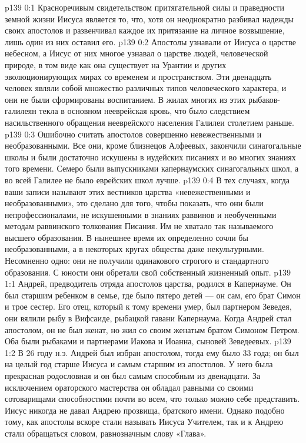 \author{Комиссия срединников}
\vs p139 0:1 Красноречивым свидетельством притягательной силы и праведности земной жизни Иисуса является то, что, хотя он неоднократно разбивал надежды своих апостолов и развенчивал каждое их притязание на личное возвышение, лишь один из них оставил его.
\vs p139 0:2 Апостолы узнавали от Иисуса о царстве небесном, а Иисус от них многое узнавал о царстве людей, человеческой природе, в том виде как она существует на Урантии и других эволюционирующих мирах со временем и пространством. Эти двенадцать человек являли собой множество различных типов человеческого характера, и они не были сформированы  воспитанием. В жилах многих из этих рыбаков\hyp{}галилеян текла в основном нееврейская кровь, что было следствием насильственного обращения нееврейского населения Галилеи столетием раньше.
\vs p139 0:3 \pc Ошибочно считать апостолов совершенно невежественными и необразованными. Все они, кроме близнецов Алфеевых, закончили синагогальные школы и были достаточно искушены в иудейских писаниях и во многих знаниях того времени. Семеро были выпускниками капернаумских синагогальных школ, а во всей Галилее не было еврейских школ лучше.
\vs p139 0:4 В тех случаях, когда ваши записи называют этих вестников царства «невежественными и необразованными», это сделано для того, чтобы показать, что они были непрофессионалами, не искушенными в знаниях раввинов и необученными методам раввинского толкования Писания. Им не хватало так называемого высшего образования. В нынешнее время их определенно сочли бы необразованными, а в некоторых кругах общества даже некультурными. Несомненно одно: они не получили одинакового строгого и стандартного образования. С юности они обретали свой собственный жизненный опыт.
\vs p139 1:1 Андрей, предводитель отряда апостолов царства, родился в Капернауме. Он был старшим ребенком в семье, где было пятеро детей --- он сам, его брат Симон и трое сестер. Его отец, который к тому времени умер, был партнером Зеведея, они вялили рыбу в Вифсаиде, рыбацкой гавани Капернаума. Когда Андрей стал апостолом, он не был женат, но жил со своим женатым братом Симоном Петром. Оба были рыбаками и партнерами Иакова и Иоанна, сыновей Зеведеевых.
\vs p139 1:2 В 26 году н.э. Андрей был избран апостолом, тогда ему было 33 года; он был на целый год старше Иисуса и самым старшим из апостолов. У него была прекрасная родословная и он был самым способным из двенадцати. За исключением ораторского мастерства он обладал равными со своими сотоварищами способностями почти во всем, что только можно себе представить. Иисус никогда не давал Андрею прозвища, братского имени. Однако подобно тому, как апостолы вскоре стали называть Иисуса Учителем, так и к Андрею стали обращаться словом, равнозначным слову «Глава».
